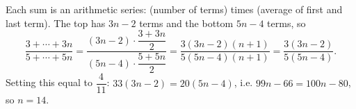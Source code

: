 Each sum is an arithmetic series: (number of terms) times (average of first and last term). The top has $3n-2$ terms and the bottom $5n-4$ terms, so
\[\dfrac{3+\cdots+3n}{5+\cdots+5n}=\dfrac{(3n-2)\cdot\dfrac{3+3n}2}{(5n-4)\cdot\dfrac{5+5n}2}=\dfrac{3(3n-2)(n+1)}{5(5n-4)(n+1)}=\dfrac{3(3n-2)}{5(5n-4)}.\]
Setting this equal to $\dfrac4{11}$: $33(3n-2)=20(5n-4)$, i.e. $99n-66=100n-80$, so $n=\boxed{14}$.
